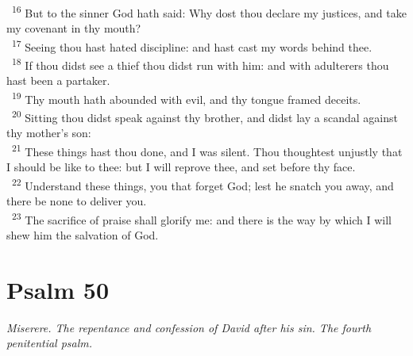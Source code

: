 \documentclass[a5paper,12pt]{article}
\begin{document}
\begin{multicols*}{2}
~\textsuperscript{16} But to the sinner God hath said: Why dost thou declare my justices, and take my covenant in thy mouth?\\
~\textsuperscript{17} Seeing thou hast hated discipline: and hast cast my words behind thee.\\
~\textsuperscript{18} If thou didst see a thief thou didst run with him: and with adulterers thou hast been a partaker.\\
~\textsuperscript{19} Thy mouth hath abounded with evil, and thy tongue framed deceits.\\
~\textsuperscript{20} Sitting thou didst speak against thy brother, and didst lay a scandal against thy mother's son:\\
~\textsuperscript{21} These things hast thou done, and I was silent. Thou thoughtest unjustly that I should be like to thee: but I will reprove thee, and set before thy face.\\
~\textsuperscript{22} Understand these things, you that forget God; lest he snatch you away, and there be none to deliver you.\\
~\textsuperscript{23} The sacrifice of praise shall glorify me: and there is the way by which I will shew him the salvation of God.\\

\section{Psalm 50}
\label{sec:org9a30656}
\emph{Miserere. The repentance and confession of David after his sin. The fourth penitential psalm.}\\


\end{multicols*}
\end{document}

